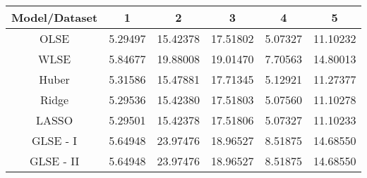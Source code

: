 \documentclass[letter,12pt]{article} %
\begin{document}
	\begin{tabular}{|c||c|c|c|c|c|}
		\hline 
		Model/Dataset   &1  &2  &3& 4   &5  \\ 
		\hline 
		OLSE &5.29497 & 15.42378 & 17.51802 &5.07327 & 11.10232 \\ 
		\hline 
		WLSE &  5.84677& 19.88008&19.01470 & 7.70563 & 14.80013  \\ 
		\hline 
		Huber & 5.31586 &   15.47881&   17.71345 &  5.12921& 11.27377 \\ 
		\hline 
		Ridge&5.29536&15.42380&17.51803&5.07560&11.10278  \\ 
		\hline 
		LASSO&5.29501 & 15.42378     &17.51806& 5.07327&    11.10233  \\ 
		\hline 
		GLSE - I &5.64948    &23.97476& 18.96527    &8.51875&   14.68550  \\ 
		\hline 
		GLSE - II &5.64948   &23.97476& 18.96527    &8.51875&   14.68550   \\ 
		\hline 
	\end{tabular} 
	
	
	
\end{document}
